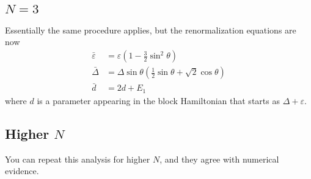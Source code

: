 \documentclass[10pt]{article}
\theoremstyle{definition}
\begin{document}
\subsection{$N=3$}
Essentially the same procedure applies, but the renormalization equations are now
\begin{align*}
\bar \varepsilon &= \varepsilon \left ( 1- \frac{3}{2} \sin^2 \theta \right)\\
\bar \Delta &= \Delta \sin \theta \left(\frac{1}{2} \sin \theta + \sqrt 2 \cos \theta \right)\\
\bar d &= 2d + E_1
\end{align*}
where $d$ is a parameter appearing in the block Hamiltonian that starts as $\Delta + \varepsilon$.

\subsection{Higher $N$}
You can repeat this analysis for higher $N$, and they agree with numerical evidence.
\end{document}
